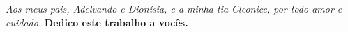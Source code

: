 



\section*{}
\vspace{20cm}
\begin{flushright}

\textit{
\hspace{8cm} Aos meus pais, Adelvando e Dionísia, e a
\hspace{7cm} minha tia Cleonice, por todo amor e cuidado.}
\hspace{15cm}\textbf{Dedico este trabalho a vocês.}
\end{flushright}



